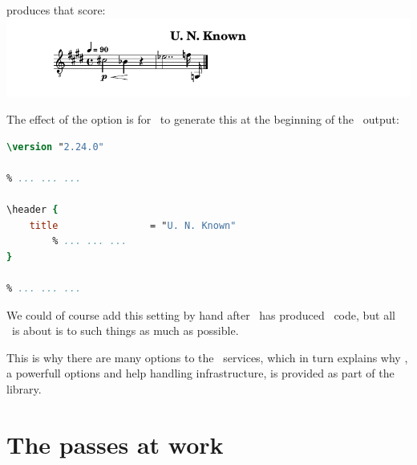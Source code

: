 produces that score:\\
\includegraphics[scale=0.7]{../graphics/MinimalScoreWithAnotherTitle.png}

The effect of the  option is for \xmlToLy\ to generate this at the beginning of the \lily\ output:
\begin{lstlisting}[language=Lilypond]
\version "2.24.0"

% ... ... ...

\header {
    title                = "U. N. Known"
		% ... ... ...
}

% ... ... ...
\end{lstlisting}

We could of course add this  setting by hand after \xmlToLy\ has produced \lily\ code, but all \mf\ is about is to  such things as much as possible.

This is why there are  many options to the \mf\ services, which in turn explains why \oahRepr, a powerfull options and help handling infrastructure, is provided as part of the library.


\section{The passes at work}

